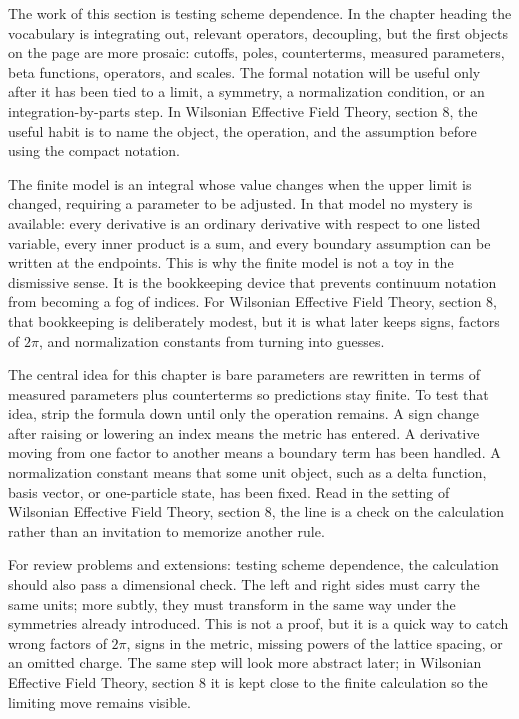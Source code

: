 The work of this section is testing scheme dependence.  In the chapter heading the vocabulary is integrating out, relevant operators, decoupling, but the first objects on the page are more prosaic: cutoffs, poles, counterterms, measured parameters, beta functions, operators, and scales.  The formal notation will be useful only after it has been tied to a limit, a symmetry, a normalization condition, or an integration-by-parts step.  In Wilsonian Effective Field Theory, section 8, the useful habit is to name the object, the operation, and the assumption before using the compact notation.

The finite model is an integral whose value changes when the upper limit is changed, requiring a parameter to be adjusted.  In that model no mystery is available: every derivative is an ordinary derivative with respect to one listed variable, every inner product is a sum, and every boundary assumption can be written at the endpoints.  This is why the finite model is not a toy in the dismissive sense.  It is the bookkeeping device that prevents continuum notation from becoming a fog of indices.  For Wilsonian Effective Field Theory, section 8, that bookkeeping is deliberately modest, but it is what later keeps signs, factors of \(2\pi\), and normalization constants from turning into guesses.

The central idea for this chapter is bare parameters are rewritten in terms of measured parameters plus counterterms so predictions stay finite.  To test that idea, strip the formula down until only the operation remains.  A sign change after raising or lowering an index means the metric has entered.  A derivative moving from one factor to another means a boundary term has been handled.  A normalization constant means that some unit object, such as a delta function, basis vector, or one-particle state, has been fixed.  Read in the setting of Wilsonian Effective Field Theory, section 8, the line is a check on the calculation rather than an invitation to memorize another rule.

For review problems and extensions: testing scheme dependence, the calculation should also pass a dimensional check.  The left and right sides must carry the same units; more subtly, they must transform in the same way under the symmetries already introduced.  This is not a proof, but it is a quick way to catch wrong factors of \(2\pi\), signs in the metric, missing powers of the lattice spacing, or an omitted charge.  The same step will look more abstract later; in Wilsonian Effective Field Theory, section 8 it is kept close to the finite calculation so the limiting move remains visible.

